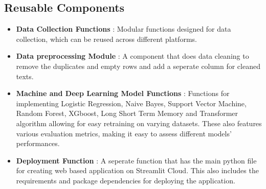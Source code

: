 \subsection{Reusable Components}
\begin{itemize}
    \item \textbf{Data Collection Functions} :
    \noindent
    Modular functions designed for data collection, which can be reused across different platforms.
    \item \textbf{Data preprocessing Module} :
    \noindent
    A component that does data cleaning to remove the duplicates and empty rows and add a seperate column for cleaned texts. 
    \item \textbf{Machine and Deep Learning Model Functions} :
    \noindent
    Functions for implementing Logistic Regression, Naive Bayes, Support Vector Machine, Random Forest, XGboost, Long Short Term Memory and Transformer algorithm allowing for easy retraining on varying datasets. These also features various evaluation metrics, making it easy to assess different models' performances.
    \item \textbf{Deployment Function} :
    \noindent
    A seperate function that has the main python file for creating web based application on Streamlit Cloud. This also includes the requirements and package dependencies for deploying the application.
\end{itemize}


